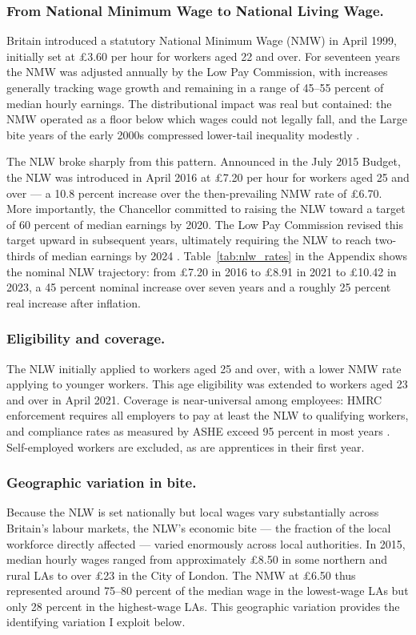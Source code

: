 \documentclass[12pt]{article}
\begin{document}
\subsubsection*{From National Minimum Wage to National Living Wage.}
Britain introduced a statutory National Minimum Wage (NMW) in April 1999, initially set at \pounds3.60 per hour for workers aged 22 and over. For seventeen years the NMW was adjusted annually by the Low Pay Commission, with increases generally tracking wage growth and remaining in a range of 45--55 percent of median hourly earnings. The distributional impact was real but contained: the NMW operated as a floor below which wages could not legally fall, and the Large bite years of the early 2000s compressed lower-tail inequality modestly \citep{butcher2012minimum}.

The NLW broke sharply from this pattern. Announced in the July 2015 Budget, the NLW was introduced in April 2016 at \pounds7.20 per hour for workers aged 25 and over --- a 10.8 percent increase over the then-prevailing NMW rate of \pounds6.70. More importantly, the Chancellor committed to raising the NLW toward a target of 60 percent of median earnings by 2020. The Low Pay Commission revised this target upward in subsequent years, ultimately requiring the NLW to reach two-thirds of median earnings by 2024 \citep{lpc2023report}. Table~\ref{tab:nlw_rates} in the Appendix shows the nominal NLW trajectory: from \pounds7.20 in 2016 to \pounds8.91 in 2021 to \pounds10.42 in 2023, a 45 percent nominal increase over seven years and a roughly 25 percent real increase after inflation.

\subsubsection*{Eligibility and coverage.}
The NLW initially applied to workers aged 25 and over, with a lower NMW rate applying to younger workers. This age eligibility was extended to workers aged 23 and over in April 2021. Coverage is near-universal among employees: HMRC enforcement requires all employers to pay at least the NLW to qualifying workers, and compliance rates as measured by ASHE exceed 95 percent in most years \citep{lpc2023report}. Self-employed workers are excluded, as are apprentices in their first year.

\subsubsection*{Geographic variation in bite.}
Because the NLW is set nationally but local wages vary substantially across Britain's labour markets, the NLW's economic bite --- the fraction of the local workforce directly affected --- varied enormously across local authorities. In 2015, median hourly wages ranged from approximately \pounds8.50 in some northern and rural LAs to over \pounds23 in the City of London. The NMW at \pounds6.50 thus represented around 75--80 percent of the median wage in the lowest-wage LAs but only 28 percent in the highest-wage LAs. This geographic variation provides the identifying variation I exploit below.
\end{document}

